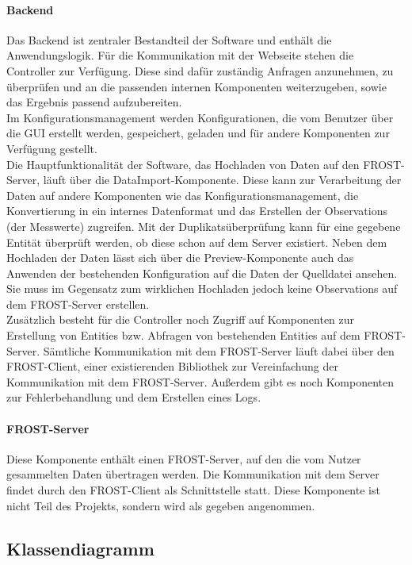 \paragraph{Backend}
Das Backend ist zentraler Bestandteil der Software und enthält die Anwendungslogik.
Für die Kommunikation mit der Webseite stehen die Controller zur Verfügung.
Diese sind dafür zuständig Anfragen anzunehmen, zu überprüfen und an die passenden internen Komponenten weiterzugeben, sowie das Ergebnis passend aufzubereiten.\\

Im Konfigurationsmanagement werden Konfigurationen, die vom Benutzer über die GUI erstellt werden, gespeichert, geladen und für andere Komponenten zur Verfügung gestellt.\\

Die Hauptfunktionalität der Software, das Hochladen von Daten auf den FROST-Server, läuft über die DataImport-Komponente.
Diese kann zur Verarbeitung der Daten auf andere Komponenten wie das Konfigurationsmanagement, die Konvertierung in ein internes Datenformat und das Erstellen der Observations (der Messwerte) zugreifen.
Mit der Duplikatsüberprüfung kann für eine gegebene Entität überprüft werden, ob diese schon auf dem Server existiert.
Neben dem Hochladen der Daten lässt sich über die Preview-Komponente auch das Anwenden der bestehenden Konfiguration auf die Daten der Quelldatei ansehen.
Sie muss im Gegensatz zum wirklichen Hochladen jedoch keine Observations auf dem FROST-Server erstellen.\\

Zusätzlich besteht für die Controller noch Zugriff auf Komponenten zur Erstellung von Entities bzw. Abfragen von bestehenden Entities auf dem FROST-Server.
Sämtliche Kommunikation mit dem FROST-Server läuft dabei über den FROST-Client, einer existierenden Bibliothek zur Vereinfachung der Kommunikation mit dem FROST-Server.
Außerdem gibt es noch Komponenten zur Fehlerbehandlung und dem Erstellen eines Logs.

\paragraph{FROST-Server}
Diese Komponente enthält einen FROST-Server, auf den die vom Nutzer gesammelten Daten übertragen werden.
Die Kommunikation mit dem Server findet durch den FROST-Client als Schnittstelle statt.
Diese Komponente ist nicht Teil des Projekts, sondern wird als gegeben angenommen.

\subsection{Klassendiagramm}

